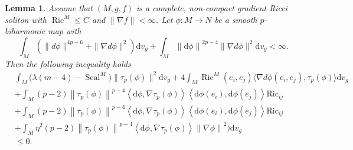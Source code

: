 \documentclass[12pt,UTF8]{article}
\theoremstyle{plain}
\newtheorem{lem}{Lemma}
\theoremstyle{definition}
\def\d {\mathrm{d}}
\def\Ric {\mathrm{Ric}}
\def\na{\ensuremath{\nabla}}
\renewcommand{\d}[1]{\mathbb{#1}}
\renewcommand{\(}{\left(}
\renewcommand{\)}{\right)}
\renewcommand{\leq}{\leqslant}
\newcommand{\norm}[1]{\left\lVert#1\right\rVert}%
\def\Ric{\mathrm{Ric\, }}
\numberwithin{equation}{subsection}
\def\na{\nabla}
\newcommand{\dv}{\operatorname{div}}
\renewcommand{\leq}{\leqslant}
\renewcommand{\(}{\left(}
\renewcommand{\)}{\right)}
\def\d{\mathrm{d}}
\def \d {\mathrm{d}}
\def \Ric {\mathrm{Ric}}
\def\dv{\d v_g}
\numberwithin{equation}{section}
\begin{document}
\begin{lem}\label{15}
	Assume that $(M,g,f)$ is a complete, non-compact gradient Ricci soliton
	with $\operatorname{Ric}^M\leq C$ and $\|\nabla f\|<\infty$.
	Let $\phi\colon M\to N$ be a smooth $p$-biharmonic map with 
	\begin{equation}\label{14}
		\int_M(\|d\phi\|^{4p-6}+\|\na d\phi\|^2)\dv+\int_M\norm{\d \phi}^{2p-4} \|\na d\phi\|^2 \dv<\infty.
	\end{equation}
	Then the following inequality holds
	\begin{equation}\label{20}
		\begin{split}
			&\int_M\big(\lambda(m-4)-\operatorname{Scal}^M\big)\|\tau_p(\phi)\|^2\dv
			+4\int_M\operatorname{Ric}^M(e_i,e_j)\langle\na d\phi(e_i,e_j),\tau_p(\phi)\rangle \dv\\
			&+\int_M (p-2)\norm{\tau_p(\phi)}^{p-4}\left\langle \d \phi,\na \tau_p(\phi) \right\rangle\left\langle \d \phi(e_i),\d \phi(e_j) \right\rangle\Ric_{ij}\\
			&+\int_M (p-2)\norm{\tau_p(\phi)}^{p-4}\left\langle \d \phi,\na \tau_p(\phi) \right\rangle\left\langle \d \phi(e_i),\d \phi(e_j) \right\rangle\Ric_{ij}\\&+\int_M \eta^2(p-2)\norm{\tau_p(\phi)}^{p-4}\left\langle \d \phi,\na \tau_p(\phi) \right\rangle\norm{\na \phi}^2\bigg) \dv\\
			&\leq 0.
		\end{split}
	\end{equation}
\end{lem}
\end{document}
